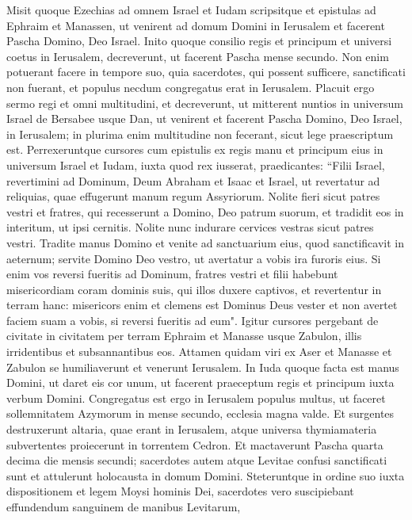 \begin{biblechapter}  
\verse Misit quoque Ezechias ad omnem Israel et Iudam scripsitque et epistulas ad Ephraim et Manassen, ut venirent ad domum Domini in Ierusalem et facerent Pascha Domino, Deo Israel. 
\verse Inito quoque consilio regis et principum et universi coetus in Ierusalem, decreverunt, ut facerent Pascha mense secundo.  
\verse Non enim potuerant facere in tempore suo, quia sacerdotes, qui possent sufficere, sanctificati non fuerant, et populus necdum congregatus erat in Ierusalem. 
\verse Placuit ergo sermo regi et omni multitudini, 
\verse et decreverunt, ut mitterent nuntios in universum Israel de Bersabee usque Dan, ut venirent et facerent Pascha Domino, Deo Israel, in Ierusalem; in plurima enim multitudine non fecerant, sicut lege praescriptum est. 
\verse Perrexeruntque cursores cum epistulis ex regis manu et principum eius in universum Israel et Iudam, iuxta quod rex iusserat, praedicantes: “Filii Israel, revertimini ad Dominum, Deum Abraham et Isaac et Israel, ut revertatur ad reliquias, quae effugerunt manum regum Assyriorum. 
\verse Nolite fieri sicut patres vestri et fratres, qui recesserunt a Domino, Deo patrum suorum, et tradidit eos in interitum, ut ipsi cernitis. 
\verse Nolite nunc indurare cervices vestras sicut patres vestri. Tradite manus Domino et venite ad sanctuarium eius, quod sanctificavit in aeternum; servite Domino Deo vestro, ut avertatur a vobis ira furoris eius. 
\verse Si enim vos reversi fueritis ad Dominum, fratres vestri et filii habebunt misericordiam coram dominis suis, qui illos duxere captivos, et revertentur in terram hanc: misericors enim et clemens est Dominus Deus vester et non avertet faciem suam a vobis, si reversi fueritis ad eum". 
\verse Igitur cursores pergebant de civitate in civitatem per terram Ephraim et Manasse usque Zabulon, illis irridentibus et subsannantibus eos. 
\verse Attamen quidam viri ex Aser et Manasse et Zabulon se humiliaverunt et venerunt Ierusalem. 
\verse In Iuda quoque facta est manus Domini, ut daret eis cor unum, ut facerent praeceptum regis et principum iuxta verbum Domini. 
\verse Congregatus est ergo in Ierusalem populus multus, ut faceret sollemnitatem Azymorum in mense secundo, ecclesia magna valde. 
\verse Et surgentes destruxerunt altaria, quae erant in Ierusalem, atque universa thymiamateria subvertentes proiecerunt in torrentem Cedron. 
\verse Et mactaverunt Pascha quarta decima die mensis secundi; sacerdotes autem atque Levitae confusi sanctificati sunt et attulerunt holocausta in domum Domini. 
\verse Steteruntque in ordine suo iuxta dispositionem et legem Moysi hominis Dei, sacerdotes vero suscipiebant effundendum sanguinem de manibus Levitarum, 

\end{biblechapter}
